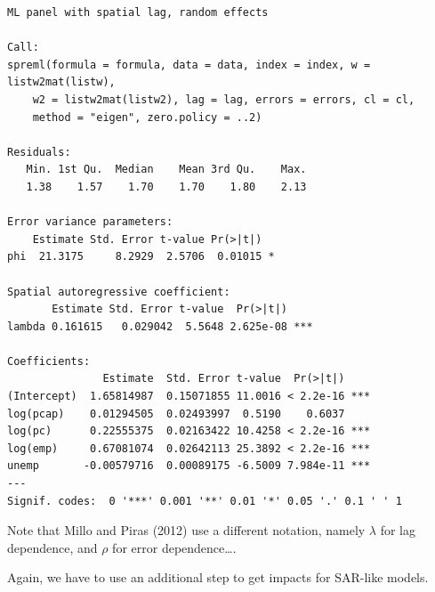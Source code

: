 \documentclass[
  letterpaper,
]{scrbook}
\newenvironment{Shaded}{\begin{snugshade}}{\end{snugshade}}
\newcommand{\AttributeTok}[1]{\textcolor[rgb]{0.40,0.45,0.13}{#1}}
\newcommand{\CommentTok}[1]{\textcolor[rgb]{0.37,0.37,0.37}{#1}}
\newcommand{\FunctionTok}[1]{\textcolor[rgb]{0.28,0.35,0.67}{#1}}
\newcommand{\NormalTok}[1]{\textcolor[rgb]{0.00,0.23,0.31}{#1}}
\newcommand{\OtherTok}[1]{\textcolor[rgb]{0.00,0.23,0.31}{#1}}
\newcommand{\SpecialCharTok}[1]{\textcolor[rgb]{0.37,0.37,0.37}{#1}}
\begin{document}
\begin{verbatim}
ML panel with spatial lag, random effects 

Call:
spreml(formula = formula, data = data, index = index, w = listw2mat(listw), 
    w2 = listw2mat(listw2), lag = lag, errors = errors, cl = cl, 
    method = "eigen", zero.policy = ..2)

Residuals:
   Min. 1st Qu.  Median    Mean 3rd Qu.    Max. 
   1.38    1.57    1.70    1.70    1.80    2.13 

Error variance parameters:
    Estimate Std. Error t-value Pr(>|t|)  
phi  21.3175     8.2929  2.5706  0.01015 *

Spatial autoregressive coefficient:
       Estimate Std. Error t-value  Pr(>|t|)    
lambda 0.161615   0.029042  5.5648 2.625e-08 ***

Coefficients:
               Estimate  Std. Error t-value  Pr(>|t|)    
(Intercept)  1.65814987  0.15071855 11.0016 < 2.2e-16 ***
log(pcap)    0.01294505  0.02493997  0.5190    0.6037    
log(pc)      0.22555375  0.02163422 10.4258 < 2.2e-16 ***
log(emp)     0.67081074  0.02642113 25.3892 < 2.2e-16 ***
unemp       -0.00579716  0.00089175 -6.5009 7.984e-11 ***
---
Signif. codes:  0 '***' 0.001 '**' 0.01 '*' 0.05 '.' 0.1 ' ' 1
\end{verbatim}

Note that Millo and Piras (2012) use a different notation, namely
\(\lambda\) for lag dependence, and \(\rho\) for error dependence\ldots.

Again, we have to use an additional step to get impacts for SAR-like
models.

\begin{Shaded}
\end{Shaded}
\end{document}
